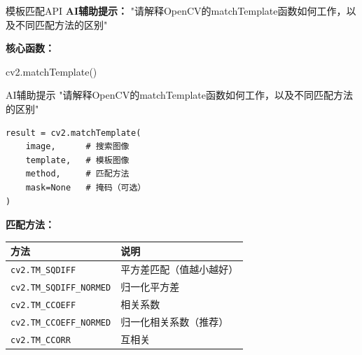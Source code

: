 \begin{frame}{模板匹配API}
    \textbf{AI辅助提示：}
    \aihint{} "请解释OpenCV的matchTemplate函数如何工作，以及不同匹配方法的区别"

    \textbf{核心函数：}

    \begin{block}{cv2.matchTemplate()}
    \begin{block}{AI辅助提示}
        \aihint{} "请解释OpenCV的matchTemplate函数如何工作，以及不同匹配方法的区别"
    \end{block}

    \begin{lstlisting}
result = cv2.matchTemplate(
    image,      # 搜索图像
    template,   # 模板图像
    method,     # 匹配方法
    mask=None   # 掩码（可选）
)
    \end{lstlisting}
    \end{block}

    \textbf{匹配方法：}
    \begin{table}
        \centering
        \tiny
        \begin{tabular}{ll}
        \toprule
        方法 & 说明 \\
        \midrule
        \texttt{cv2.TM\_SQDIFF} & 平方差匹配（值越小越好） \\
        \texttt{cv2.TM\_SQDIFF\_NORMED} & 归一化平方差 \\
        \texttt{cv2.TM\_CCOEFF} & 相关系数 \\
        \texttt{cv2.TM\_CCOEFF\_NORMED} & 归一化相关系数（推荐） \\
        \texttt{cv2.TM\_CCORR} & 互相关 \\
        \bottomrule
        \end{tabular}
    \end{table}
\end{frame}

